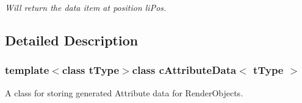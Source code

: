 \begin{DoxyCompactItemize}
\begin{DoxyCompactList}\small\item\em Will return the data item at position liPos. \end{DoxyCompactList}\end{DoxyCompactItemize}


\subsection{Detailed Description}
\subsubsection*{template$<$class tType$>$class cAttributeData$<$ tType $>$}

A class for storing generated Attribute data for RenderObjects. 